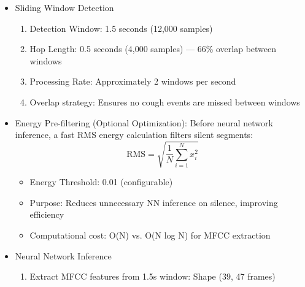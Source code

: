 \documentclass[conference]{IEEEtran}
\begin{document}
\begin{enumerate}
\begin{itemize}
                        \begin{enumerate} 
                            \item Continuous audio stream captured at 8kHz, mono channel 
                            \item Circular buffer maintains 10 seconds of recent audio (80,000 samples) 
                            \item Thread-safe deque structure with mutex-protected access 
                            \item Block size: 2048 samples for efficient callback processing
                        \end{enumerate}
                    \item Sliding Window Detection
                        \begin{enumerate} 
                            \item Detection Window: 1.5 seconds (12,000 samples) 
                            \item Hop Length: 0.5 seconds (4,000 samples) — 66\% overlap between windows 
                            \item Processing Rate: Approximately 2 windows per second 
                            \item Overlap strategy: Ensures no cough events are missed between windows 
                        \end{enumerate}
                    \item Energy Pre-filtering (Optional Optimization): 
                        Before neural network inference, a fast RMS energy calculation filters silent segments: $$\text{RMS} = \sqrt{\frac{1}{N}\sum_{i=1}^{N} x_i^2}$$
                        \begin{itemize} 
                            \item Energy Threshold: 0.01 (configurable) 
                            \item Purpose: Reduces unnecessary NN inference on silence, improving efficiency 
                            \item Computational cost: O(N) vs. O(N log N) for MFCC extraction
                        \end{itemize}
                    \item Neural Network Inference
                        \begin{enumerate} 
                            \item Extract MFCC features from 1.5s window: Shape (39, 47 frames)

\end{enumerate}
\end{itemize}
\end{enumerate}
\end{document}
